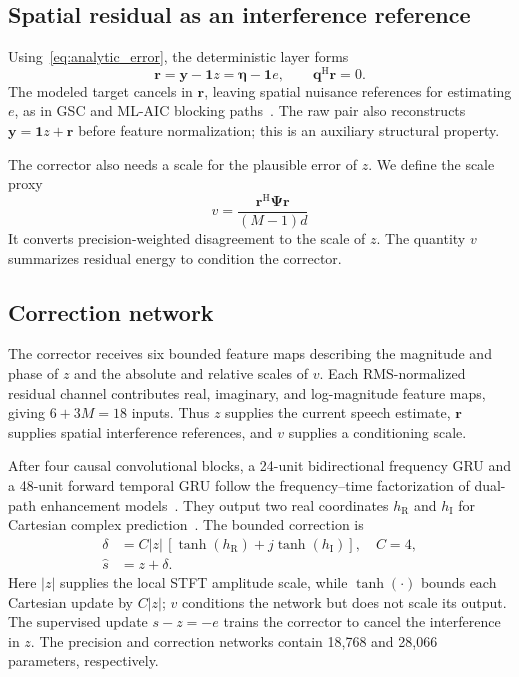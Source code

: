 \documentclass{article}
\begin{document}
\subsection{Spatial residual as an interference reference}
Using~\eqref{eq:analytic_error}, the deterministic layer forms
\begin{equation}
\mathbf r=\mathbf y-\mathbf1z=\boldsymbol\eta-\mathbf1e,
\qquad
\mathbf q^{\mathrm H}\mathbf r=0.
\label{eq:spatial_residual}
\end{equation}
The modeled target cancels in $\mathbf r$, leaving spatial nuisance references for estimating $e$, as in GSC and ML-AIC blocking paths~\cite{griffiths1982gsc,wang2023mlaic}. The raw pair also reconstructs $\mathbf y=\mathbf1z+\mathbf r$ before feature normalization; this is an auxiliary structural property.

The corrector also needs a scale for the plausible error of $z$. We define the scale proxy
\begin{equation}
v=\frac{\mathbf r^{\mathrm H}\boldsymbol\Psi\mathbf r}
{(M-1)d}
\label{eq:scale}
\end{equation}
It converts precision-weighted disagreement to the scale of $z$. The quantity $v$ summarizes residual energy to condition the corrector.

\subsection{Correction network}

The corrector receives six bounded feature maps describing the magnitude and phase of $z$ and the absolute and relative scales of $v$. Each RMS-normalized residual channel contributes real, imaginary, and log-magnitude feature maps, giving $6+3M=18$ inputs. Thus $z$ supplies the current speech estimate, $\mathbf r$ supplies spatial interference references, and $v$ supplies a conditioning scale.

After four causal convolutional blocks, a 24-unit bidirectional frequency GRU and a 48-unit forward temporal GRU follow the frequency--time factorization of dual-path enhancement models~\cite{rong2024gtcrn}. They output two real coordinates $h_{\mathrm R}$ and $h_{\mathrm I}$ for Cartesian complex prediction~\cite{hu2020dccrn}. The bounded correction is
\begin{equation}
\begin{aligned}
\delta&=C|z|\,[\tanh(h_{\mathrm R})+j\tanh(h_{\mathrm I})],\quad C=4,\\
\widehat s&=z+\delta.
\end{aligned}
\label{eq:correction}
\end{equation}
Here $|z|$ supplies the local STFT amplitude scale, while $\tanh(\cdot)$ bounds each Cartesian update by $C|z|$; $v$ conditions the network but does not scale its output. The supervised update $s-z=-e$ trains the corrector to cancel the interference in $z$. The precision and correction networks contain 18,768 and 28,066 parameters, respectively.
\end{document}
